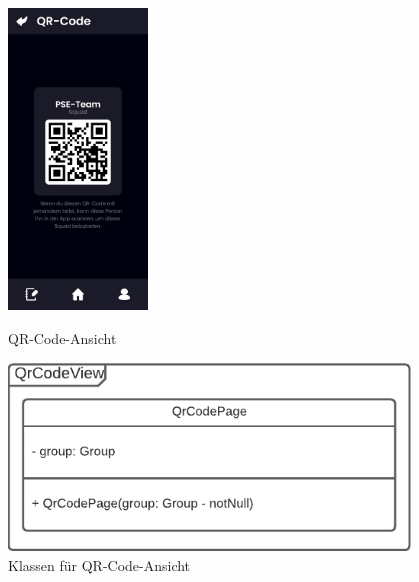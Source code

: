 \documentclass{entwurfsheft}
\begin{document}
    \begin{figure}[htp]
        \begin{minipage}
            [t]{0.49\textwidth}
            \centering
            \includegraphics[height=80mm]{images/Presentation-layer/QRCodeView.jpg}
            \caption{QR-Code-Ansicht}
        \end{minipage}
        \begin{minipage}
            [t]{0.49\textwidth}
            \centering
            \includegraphics[width=0.95\textwidth]{images/Presentation-layer/QRCodeViewClass.pdf}
            \caption{Klassen für QR-Code-Ansicht}
        \end{minipage}
    \end{figure} 
    \newpage

\newpage
\end{document}
